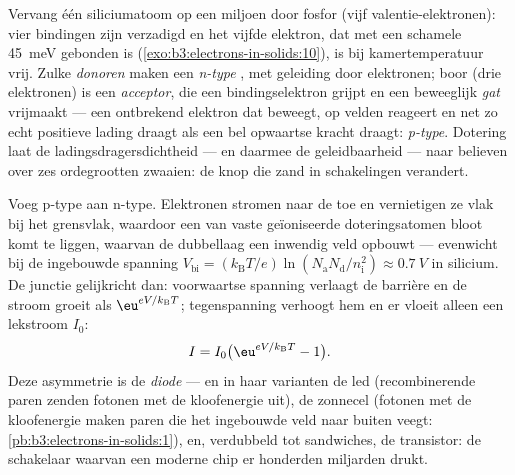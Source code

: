 \begin{definition}[Dotering]\label{def:b3:electrons-in-solids:doping}
Vervang één siliciumatoom op een miljoen door fosfor (vijf
valentie-elektronen): vier bindingen zijn verzadigd en het vijfde elektron,
dat met een schamele \qty{45}{meV} gebonden is
(\cref{exo:b3:electrons-in-solids:10}), is bij kamertemperatuur
vrij. Zulke \emph{donoren} maken een \emph{n-type}
, met geleiding door elektronen; boor (drie elektronen)
is een \emph{acceptor}, die een bindingselektron grijpt en een
beweeglijk \emph{gat} vrijmaakt --- een ontbrekend elektron dat beweegt, op
velden reageert en net zo echt positieve lading draagt als een bel
opwaartse kracht draagt: \emph{p-type}. Dotering laat de ladingsdragersdichtheid
--- en daarmee de geleidbaarheid --- naar believen over zes ordegrootten zwaaien:
de knop die zand in schakelingen verandert.
\end{definition}

\begin{proposition}[De p--n-junctie]\label{prop:b3:electrons-in-solids:junction}
Voeg p-type aan n-type. Elektronen stromen naar de  toe en
vernietigen ze vlak bij het grensvlak, waardoor een \emph{} van
vaste geïoniseerde doteringsatomen bloot komt te liggen, waarvan de dubbellaag een
inwendig veld opbouwt --- evenwicht bij de ingebouwde spanning
$V_{\text{bi}} = (k_{\text{B}}T/e)
\ln(N_{\text{a}}N_{\text{d}}/n_{\text{i}}^2) \approx
\qty{0.7}{V}$ in silicium. De junctie gelijkricht dan: voorwaartse
spanning verlaagt de barrière en de stroom groeit als
$\eu^{eV/k_{\text{B}}T}$; tegenspanning verhoogt hem en er vloeit alleen een
lekstroom $I_0$:
\[
I = I_0\big(\eu^{eV/k_{\text{B}}T} - 1\big) .
\]
Deze asymmetrie is de \emph{diode} --- en in haar varianten
de led (recombinerende paren zenden fotonen met de kloofenergie uit), de
zonnecel (fotonen met de kloofenergie maken paren die het ingebouwde veld
naar buiten veegt: \cref{pb:b3:electrons-in-solids:1}), en, verdubbeld
tot sandwiches, de transistor: de schakelaar waarvan een moderne
chip er honderden miljarden drukt.
\end{proposition}
\admitted

